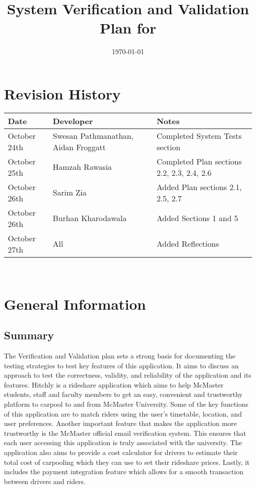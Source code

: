 \documentclass[12pt, titlepage]{article}
\begin{document}
\title{System Verification and Validation Plan for \progname{}} 
\author{\authname}
\date{\today}
	
\maketitle


\section*{Revision History}

\begin{tabularx}{\textwidth}{llX}
\toprule {\bf Date} & {\bf Developer} & {\bf Notes}\\
\midrule
October 24th & Swesan Pathmanathan, Aidan Froggatt & Completed System Tests section\\
October 25th & Hamzah Rawasia & Completed Plan sections 2.2, 2.3, 2.4, 2.6\\
October 26th & Sarim Zia & Added Plan sections 2.1, 2.5, 2.7\\
October 26th & Burhan Kharodawala & Added Sections 1 and 5\\
October 27th & All & Added Reflections \\

\bottomrule
\end{tabularx}

~\\

\newpage

\tableofcontents

\newpage



\section{General Information}

\subsection{Summary}

The Verification and Validation plan sets a strong basis for documenting the testing strategies 
to test key features of this application. It aims to discuss an approach to test the correctness, 
validity, and reliability of the application and its features. Hitchly is a rideshare application 
which aims to help McMaster students, staff and faculty members to get an easy, convenient and 
trustworthy platform to carpool to and from McMaster University. Some of the key functions of this 
application are to match riders using the user's timetable, location, and user preferences. Another 
important feature that makes the application more trustworthy is the McMaster official email verification 
system. This ensures that each user accessing this application is truly associated with the university. 
The application also aims to provide a cost calculator for drivers to estimate their total cost of carpooling
 which they can use to set their rideshare prices. Lastly, it includes the payment integration feature which 
 allows for a smooth transaction between drivers and riders.  
\end{document}
